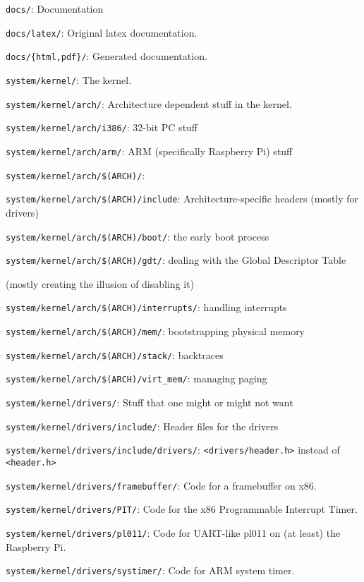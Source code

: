 \documentclass[12pt]{article}
\newcommand{\code}[1]{\colorbox{light-gray}{\texttt{#1}}}
\begin{document}
\begin{list}{}{}
\item \code{docs/}: Documentation
\item \code{docs/latex/}: Original latex documentation.
\item \code{docs/\{html,pdf\}/}: Generated documentation.
\item \code{system/kernel/}: The kernel.
\item \code{system/kernel/arch/}: Architecture dependent stuff in the kernel.
\item \code{system/kernel/arch/i386/}: 32-bit PC stuff
\item \code{system/kernel/arch/arm/}: ARM (specifically Raspberry Pi) stuff
\item \code{system/kernel/arch/\$(ARCH)/}:
\item \code{system/kernel/arch/\$(ARCH)/include}: Architecture-specific headers (mostly for drivers)
\item \code{system/kernel/arch/\$(ARCH)/boot/}: the early boot process
\item \code{system/kernel/arch/\$(ARCH)/gdt/}: dealing with the Global Descriptor Table \begin{small}(mostly creating the illusion of disabling it)\end{small}
\item \code{system/kernel/arch/\$(ARCH)/interrupts/}: handling interrupts
\item \code{system/kernel/arch/\$(ARCH)/mem/}: bootstrapping physical memory
\item \code{system/kernel/arch/\$(ARCH)/stack/}: backtraces
\item \code{system/kernel/arch/\$(ARCH)/virt_mem/}: managing paging
\item \code{system/kernel/drivers/}: Stuff that one might or might not want
\item \code{system/kernel/drivers/include/}: Header files for the drivers
\item \code{system/kernel/drivers/include/drivers/}: \code{<drivers/header.h>} instead of \code{<header.h>}
\item \code{system/kernel/drivers/framebuffer/}: Code for a framebuffer on x86.
\item \code{system/kernel/drivers/PIT/}: Code for the x86 Programmable Interrupt Timer.
\item \code{system/kernel/drivers/pl011/}: Code for UART-like pl011 on (at least) the Raspberry Pi.
\item \code{system/kernel/drivers/systimer/}: Code for ARM system timer.

\end{list}
\end{document}
